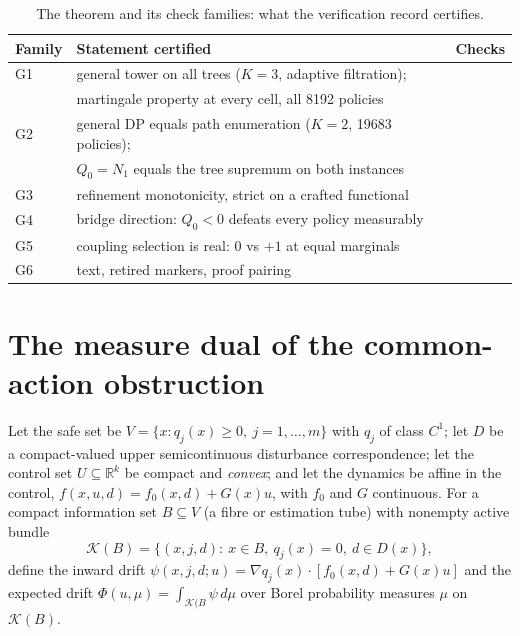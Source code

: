 \documentclass[10pt,twocolumn]{article}
\theoremstyle{plain}
\theoremstyle{definition}
\theoremstyle{remark}
\begin{document}
\begin{table}[h]
\centering\footnotesize
\caption{The theorem and its check families: what the verification record
certifies.}
\label{dual-tab:checks}
\begin{tabular}{@{}l p{4.6cm} l@{}}
\toprule
Family & Statement certified & Checks \\
\midrule
G1 & general tower on all trees ($K{=}3$, adaptive filtration); & \\
   & martingale property at every cell, all 8192 policies & \\
G2 & general DP equals path enumeration ($K{=}2$, 19683 policies); & \\
   & $Q_0 = N_1$ equals the tree supremum on both instances & \\
G3 & refinement monotonicity, strict on a crafted functional & \\
G4 & bridge direction: $Q_0 < 0$ defeats every policy measurably & \\
G5 & coupling selection is real: $0$ vs $+1$ at equal marginals & \\
G6 & text, retired markers, proof pairing & \\
\bottomrule
\end{tabular}
\end{table}

\section{The measure dual of the common-action obstruction}

Let the safe set be $V = \{x: q_{j}(x) \ge 0,\ j = 1,\dots,m\}$ with
$q_{j}$ of class $C^{1}$; let $D$ be a compact-valued upper
semicontinuous disturbance correspondence; let the control set
$U \subseteq \mathbb{R}^{k}$ be compact and \emph{convex}; and let the
dynamics be affine in the control,
$f(x,u,d) = f_{0}(x,d) + G(x)u$, with $f_{0}$ and $G$ continuous. For a
compact information set $B \subseteq V$ (a fibre or estimation tube) with
nonempty active bundle
\[
\mathcal{K}(B) = \{(x,j,d):\ x \in B,\ q_{j}(x) = 0,\ d \in D(x)\},
\]
define the inward drift
$\psi(x,j,d;u) = \nabla q_{j}(x)\cdot[f_{0}(x,d) + G(x)u]$ and the
expected drift $\Phi(u,\mu) = \int_{\mathcal{K}(B} \psi \,d\mu$ over
Borel probability measures $\mu$ on $\mathcal{K}(B)$.
\end{document}

